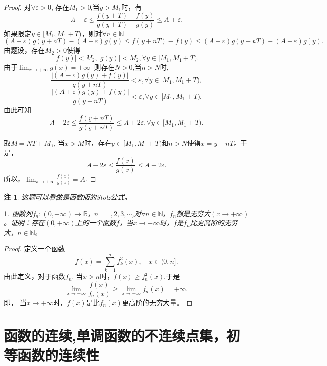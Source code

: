 \documentclass[utf8]{book}
\newtheorem{example}{}[section]             %
\newtheorem{remark}{注}
\begin{document}
\begin{proof}
对$\forall \varepsilon > 0$, 存在$M_1 > 0$,当$y>M_1$时，有
$$A-\varepsilon\leq\frac{f(y+T)-f(y)}{g(y+T) - g(y)}\leq A+\varepsilon.$$
如果限定$y\in[M_1, M_1+T)$，则对$\forall n\in\mathbb{N}$
$$(A-\varepsilon)g(y+nT)-(A-\varepsilon)g(y) \leq f(y+nT) - f(y) \leq (A+\varepsilon)g(y+nT)-(A+\varepsilon)g(y).$$
由题设，存在$M_2 > 0$使得
$$\left|f(y)\right| < M_2, \left|g(y)\right| < M_2, \forall y\in[M_1, M_1+T).$$
由于$\displaystyle\lim_{x\to +\infty}g(x)=+\infty$, 则存在$N > 0$,当$n>N$时,
$$\frac{\left|(A-\varepsilon)g(y) + f(y)\right|}{g(y+nT)} < \varepsilon, \forall y\in [M_1, M_1+T),$$
$$\frac{\left|(A+\varepsilon)g(y) + f(y)\right|}{g(y+nT)} < \varepsilon,\forall y\in[M_1, M_1+T).$$
由此可知
$$A-2\varepsilon \leq \frac{f(y+nT)}{g(y+nT)} \leq A+2\varepsilon, \forall y\in[M_1, M_1+T).$$

取$M = NT+M_1$, 当$x>M$时，存在$y\in[M_1, M_1+T)$和$n> N$使得$x=y+nT$。于是，
$$A-2\varepsilon \leq \frac{f(x)}{g(x)} \leq A+2\varepsilon.$$
所以，$\displaystyle\lim_{x\to +\infty}\frac{f(x)}{g(x)}=A$.
\end{proof}
\begin{remark}
这题可以看做是函数版的Stolz公式。
\end{remark}
\begin{example}
函数列$f_n:(0,+\infty)\rightarrow\mathbb{R}$，$n=1,2,3,\cdots$,对$\forall n\in\mathbb{N}$，$f_n$都是无穷大$(x\to +\infty)$。证明：存在$(0,+\infty)$上的一个函数$f$，当$x\to +\infty$时，$f$是$f_n$比更高阶的无穷大，$n\in\mathbb{N}$。
\end{example}
\begin{proof}定义一个函数
$$f(x) = \displaystyle\sum_{k=1}^nf_k^2(x), \quad x\in(0, n].$$
由此定义，对于函数$f_n$, 当$x>n$时，$f(x) \geq f^2_n(x)$.于是
$$\displaystyle\lim_{x\to +\infty}\frac{f(x)}{f_n(x)} \geq \displaystyle\lim_{x\to +\infty}f_n(x) = +\infty.$$
即， 当$x\to +\infty$时，$f(x)$是比$f_n(x)$更高阶的无穷大量。
\end{proof}
\section{函数的连续,单调函数的不连续点集，初等函数的连续性}
\end{document}
